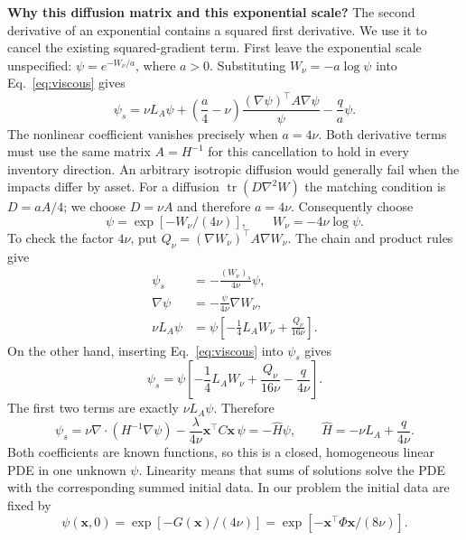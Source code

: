 \documentclass[11pt,a4paper]{article}
\begin{document}
\textbf{Why this diffusion matrix and this exponential scale?}
The second derivative of an exponential contains a squared first
derivative. We use it to cancel the existing squared-gradient term.
First leave the exponential scale unspecified: $\psi=e^{-W_\nu/a}$,
where $a>0$. Substituting $W_\nu=-a\log\psi$ into
Eq.~\eqref{eq:viscous} gives
\begin{equation}
 \psi_s=\nu L_A\psi+
 \left(\frac a4-\nu\right)
 \frac{(\nabla\psi)^\top A\nabla\psi}{\psi}
 -\frac q a\psi.
 \label{eq:stage4-scale-choice}
\end{equation}
The nonlinear coefficient vanishes precisely when $a=4\nu$.
Both derivative terms must use the same matrix $A=H^{-1}$ for this
cancellation to hold in every inventory direction. An arbitrary isotropic
diffusion would generally fail when the impacts differ by asset.
For a diffusion $\operatorname{tr}(D\nabla^2W)$ the matching condition
is $D=aA/4$; we choose $D=\nu A$ and therefore $a=4\nu$.
Consequently choose
\begin{equation}
 \psi=\exp[-W_\nu/(4\nu)],\qquad W_\nu=-4\nu\log\psi.
 \label{eq:stage4-transform}
\end{equation}
To check the factor $4\nu$, put
$Q_\nu=(\nabla W_\nu)^\top A\nabla W_\nu$. The chain and product rules give
\begin{align}
 \psi_s&=-\frac{(W_\nu)_s}{4\nu}\psi,\nonumber\\
 \nabla\psi&=-\frac{\psi}{4\nu}\nabla W_\nu,\nonumber\\
 \nu L_A\psi&=\psi\left[-\frac14L_AW_\nu
                              +\frac{Q_\nu}{16\nu}\right].
 \label{eq:stage4-chain}
\end{align}
On the other hand, inserting Eq.~\eqref{eq:viscous} into $\psi_s$ gives
\[
 \psi_s=\psi\left[-\frac14L_AW_\nu+
                         \frac{Q_\nu}{16\nu}-\frac{q}{4\nu}\right].
\]
The first two terms are exactly $\nu L_A\psi$. Therefore
\begin{equation}
 \boxed{\psi_s=\nu\nabla\!\cdot(H^{-1}\nabla\psi)
 -\frac{\lambda}{4\nu}\mathbf x^\top C\mathbf x\,\psi
 =-\hat H\psi,\qquad
 \hat H=-\nu L_A+\frac{q}{4\nu}.}
 \label{eq:linearised}
\end{equation}
Both coefficients are known functions, so this is a closed, homogeneous
linear PDE in one unknown $\psi$. Linearity means that sums of solutions
solve the PDE with the corresponding summed initial data. In our problem
the initial data are fixed by
\begin{equation}
 \psi(\mathbf x,0)=\exp[-G(\mathbf x)/(4\nu)]
 =\exp[-\mathbf x^\top\Phi\mathbf x/(8\nu)].
 \label{eq:stage4-initial}
\end{equation}
\end{document}
